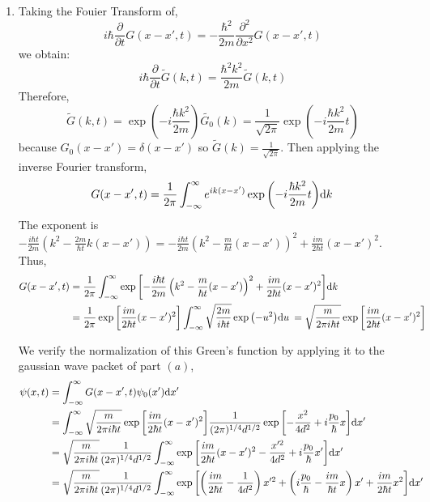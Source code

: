 \documentclass[12pt]{extarticle}
\begin{document}
\begin{enumerate}
\item Taking the Fouier Transform of, \[i \hbar \frac{\partial}{\partial t} G(x - x', t) = -\frac{\hbar^2}{2m} \frac{\partial^2}{\partial x^2} G(x - x', t)  \]
we obtain: \[i \hbar \frac{\partial}{\partial t} \tilde{G}(k, t) = \frac{\hbar^2 k^2}{2m} \tilde{G}(k, t)\]
Therefore, \[\tilde{G}(k, t) = \exp{\left(- i \frac{\hbar k^2}{2m} \right)} \tilde{G_0}(k) =  \frac{1}{\sqrt{2 \pi}} \exp{\left(- i \frac{\hbar k^2}{2m} t \right)} \]
because $G_0(x - x') = \delta(x - x')$ so $\tilde{G}(k) = \frac{1}{\sqrt{2 \pi}}$. Then applying the inverse Fourier transform, \[G(x - x', t) = \frac{1}{2 \pi} \int_{-\infty}^{\infty} e^{ik(x - x')} \exp{\left( - i \frac{\hbar k^2}{2m} t \right)} \mathrm{d}k \: \] 
The exponent is $-\frac{i \hbar t}{2 m} \left(k^2 - \frac{2m}{\hbar t} k (x - x') \right) = -\frac{i \hbar t}{2 m} \left(k^2 - \frac{m}{\hbar t} (x - x') \right)^2 + \frac{im}{2 \hbar t} (x - x')^2$. Thus,
\begin{align*}
G(x - x', t) &= \frac{1}{2 \pi} \int_{-\infty}^{\infty} \exp{\left[-\frac{i \hbar t}{2 m} \left(k^2 - \frac{m}{\hbar t} (x - x') \right)^2 + \frac{im}{2 \hbar t} (x - x')^2 \right]} \mathrm{d}k \: \\ &= \frac{1}{2 \pi} \exp{\left[\frac{im}{2 \hbar t} (x - x')^2 \right]} \int_{-\infty}^{\infty} \sqrt{\frac{2m}{i \hbar t}} \exp{\left( - u^2 \right)} \mathrm{d}u \:  = \sqrt{\frac{m}{ 2 \pi  i \hbar t}} \exp{\left[\frac{im}{2 \hbar t} (x - x')^2 \right]} 
\end{align*}

We verify the normalization of this Green's function by applying it to the gaussian wave packet of part $(a)$,
\begin{align*}
\psi(x, t) &= \int_{-\infty}^{\infty} G(x - x', t) \psi_0(x') \mathrm{d}x' \: \\ &= \int_{-\infty}^{\infty} \sqrt{\frac{m}{2 \pi i \hbar t}} \exp{\left[\frac{im}{2 \hbar t} (x - x')^2 \right]} \frac{1}{(2 \pi)^{1/4} d^{1/2}} \exp{\left[-\frac{x^2}{4 d^2} + i \frac{p_0}{\hbar} x \right]} \mathrm{d}x' \: \\
&= \sqrt{\frac{m}{2 \pi i \hbar t}} \frac{1}{(2 \pi)^{1/4} d^{1/2}} \int_{-\infty}^{\infty} \exp{\left[\frac{im}{2 \hbar t} (x - x')^2 -\frac{x'^2}{4 d^2} + i \frac{p_0}{\hbar} x' \right]} \mathrm{d}x' \: \\
&= \sqrt{\frac{m}{2 \pi i \hbar t}} \frac{1}{(2 \pi)^{1/4} d^{1/2}} \int_{-\infty}^{\infty} \exp{\left[ \left(\frac{im}{2 \hbar t} - \frac{1}{4 d^2} \right) x'^2 + \left(i \frac{p_0}{\hbar} - \frac{im}{\hbar t} x \right)x' + \frac{im}{2\hbar t} x^2 \right]} \mathrm{d}x' \:
\end{align*}


\end{enumerate}
\end{document}

